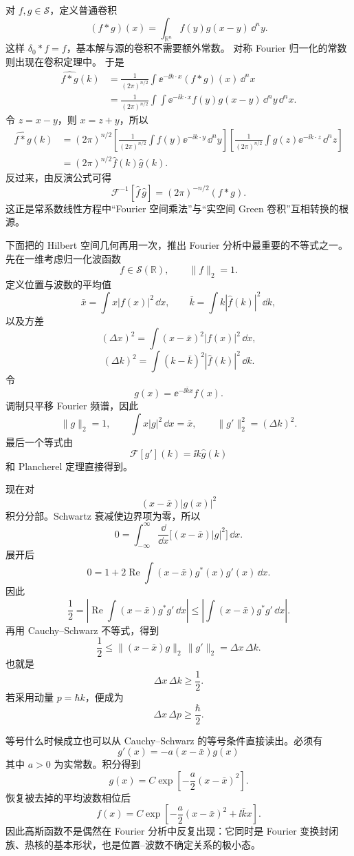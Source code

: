 对 $f,g\in\mathcal S$，定义普通卷积
\[
(f*g)(x)
=\int_{\mathbb R^n}f(y)g(x-y)\,\dd^n y.
\]
这样 $\delta_0*f=f$，基本解与源的卷积不需要额外常数。
对称 Fourier 归一化的常数则出现在卷积定理中。
于是
\[
\begin{aligned}
\widehat{f*g}(k)
&=\frac1{(2\pi)^{n/2}}
 \int \ee^{-\ii k\cdot x}(f*g)(x)\,\dd^n x\\
&=\frac1{(2\pi)^{n/2}}
 \int\!\int \ee^{-\ii k\cdot x}f(y)g(x-y)
 \,\dd^n y\,\dd^n x.
\end{aligned}
\]
令 $z=x-y$，则 $x=z+y$，所以
\[
\begin{aligned}
\widehat{f*g}(k)
&=(2\pi)^{n/2}\left[
\frac1{(2\pi)^{n/2}}
\int f(y)\ee^{-\ii k\cdot y}\,\dd^n y
\right]
\left[
\frac1{(2\pi)^{n/2}}
\int g(z)\ee^{-\ii k\cdot z}\,\dd^n z
\right]\\
&=(2\pi)^{n/2}\widehat f(k)\widehat g(k).
\end{aligned}
\]
反过来，由反演公式可得
\[
\mathcal F^{-1}[\widehat f\,\widehat g]=(2\pi)^{-n/2}(f*g).
\]
这正是常系数线性方程中``Fourier 空间乘法''与``实空间 Green 卷积''互相转换的根源。

下面把的 Hilbert 空间几何再用一次，推出 Fourier 分析中最重要的不等式之一。先在一维考虑归一化波函数
\[
f\in\mathcal S(\mathbb R),
\qquad \|f\|_2=1.
\]
定义位置与波数的平均值
\[
\bar x=\int x|f(x)|^2\,\dd x,
\qquad
\bar k=\int k|\widehat f(k)|^2\,\dd k,
\]
以及方差
\[
(\Delta x)^2
=\int (x-\bar x)^2|f(x)|^2\,\dd x,
\]
\[
(\Delta k)^2
=\int (k-\bar k)^2|\widehat f(k)|^2\,\dd k.
\]
令
\[
g(x)=\ee^{-\ii\bar k x}f(x).
\]
调制只平移 Fourier 频谱，因此
\[
\|g\|_2=1,
\qquad
\int x|g|^2\,\dd x=\bar x,
\qquad
\|g'\|_2^2=(\Delta k)^2.
\]
最后一个等式由
\[
\mathcal F[g'](k)=\ii k\widehat g(k)
\]
和 Plancherel 定理直接得到。

现在对
\[
(x-\bar x)|g(x)|^2
\]
积分分部。Schwartz 衰减使边界项为零，所以
\[
0
=\int_{-\infty}^{\infty}
\frac{\dd}{\dd x}\big[(x-\bar x)|g|^2\big] \,\dd x.
\]
展开后
\[
0
=1+2\operatorname{Re}
\int (x-\bar x)g^*(x)g'(x)\,\dd x.
\]
因此
\[
\frac12
=\left|
\operatorname{Re}
\int (x-\bar x)g^*g'\,\dd x
\right|
\le
\left|
\int (x-\bar x)g^*g'\,\dd x
\right|.
\]
再用 Cauchy--Schwarz 不等式，得到
\[
\frac12
\le
\|(x-\bar x)g\|_2\,\|g'\|_2
=\Delta x\,\Delta k.
\]
也就是
\begin{equation*}\boxed{\Delta x\,\Delta k\ge\frac12.}\end{equation*}
若采用动量 $p=\hbar k$，便成为
\[
\Delta x\,\Delta p\ge\frac\hbar2.
\]

等号什么时候成立也可以从 Cauchy--Schwarz 的等号条件直接读出。必须有
\[
g'(x)=-a(x-\bar x)g(x)
\]
其中 $a>0$ 为实常数。积分得到
\[
g(x)=C\exp\!\left[-\frac a2(x-\bar x)^2\right].
\]
恢复被去掉的平均波数相位后
\[
f(x)=C
\exp\!\left[-\frac a2(x-\bar x)^2+\ii\bar k x\right].
\]
因此高斯函数不是偶然在 Fourier 分析中反复出现：它同时是 Fourier 变换封闭族、热核的基本形状，也是位置--波数不确定关系的极小态。

